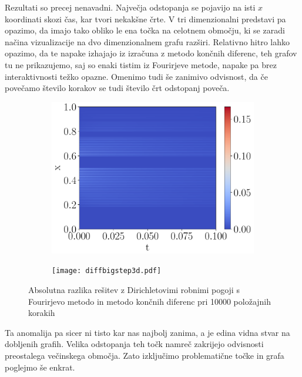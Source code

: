 \documentclass{article}
\begin{document}
Rezultati so precej nenavadni. Največja odstopanja se pojavijo na isti $x$ koordinati skozi čas, kar tvori nekakšne črte. V tri dimenzionalni predstavi pa opazimo, da imajo tako obliko le ena točka na celotnem območju, ki se zaradi načina vizualizacije na dvo dimenzionalnem grafu razširi. Relativno hitro lahko opazimo, da te napake izhajajo iz izračuna z metodo končnih diferenc, teh grafov tu ne prikazujemo, saj so enaki tistim iz Fourirjeve metode, napake pa brez interaktivnosti težko opazne. Omenimo tudi še zanimivo odvisnost, da če povečamo število korakov se tudi število črt odstopanj poveča.
\begin{figure}[H]
    \centering
    \begin{subfigure}{0.45\textwidth}
        \centering
        \includegraphics[width=\linewidth]{diffbigstep2d.pdf}
    \end{subfigure}
    \hspace{0.5cm}
    \begin{subfigure}{0.45\textwidth}
        \centering
        \texttt{[image: diffbigstep3d.pdf]}
    \end{subfigure}
	\caption{Absolutna razlika rešitev z Dirichletovimi robnimi pogoji s Fourirjevo metodo in metodo končnih diferenc pri 10000 položajnih korakih}
\end{figure}
Ta anomalija pa sicer ni tisto kar nas najbolj zanima, a je edina vidna stvar na dobljenih grafih. Velika odstopanja teh točk namreč zakrijejo odvisnosti preostalega večinskega območja. Zato izključimo problematične točke in grafa poglejmo še enkrat.
\end{document}
